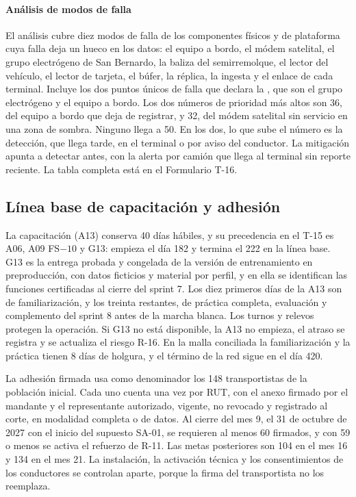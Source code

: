 \paragraph{Análisis de modos de falla}
El análisis cubre diez modos de falla de los componentes físicos y de plataforma cuya falla deja un hueco
en los datos: el equipo a bordo, el módem satelital, el grupo electrógeno de San Bernardo, la baliza del
semirremolque, el lector del vehículo, el lector de tarjeta, el búfer, la réplica, la ingesta y el enlace
de cada terminal. Incluye los dos puntos únicos de falla que declara la , que
son el grupo electrógeno y el equipo a bordo. Los dos números de prioridad más altos son 36, del equipo a
bordo que deja de registrar, y 32, del módem satelital sin servicio en una zona de sombra. Ninguno llega
a 50. En los dos, lo que sube el número es la detección, que llega tarde, en el terminal o por aviso del
conductor. La mitigación apunta a detectar antes, con la alerta por camión que llega
al terminal sin reporte reciente. La tabla completa está en el Formulario T-16.

\subsection{Línea base de capacitación y adhesión}\label{sec:8-acuerdo-capacitacion-adhesion}

La capacitación (A13) conserva 40 días hábiles, y su precedencia en el T-15 es A06, A09 FS$-10$ y G13:
empieza el día 182 y termina el 222 en la línea base. G13 es la entrega probada y congelada de la versión
de entrenamiento en preproducción, con datos ficticios y material por perfil, y en ella se identifican
las funciones certificadas al cierre del sprint 7. Los diez primeros días de la A13 son de
familiarización, y los treinta restantes, de práctica completa, evaluación y complemento del sprint 8
antes de la marcha blanca. Los turnos y relevos protegen la operación. Si G13 no está disponible, la A13
no empieza, el atraso se registra y se actualiza el riesgo R-16. En la malla conciliada la familiarización
y la práctica tienen 8 días de holgura, y el término de la red sigue en el día 420.

La adhesión firmada usa como denominador los 148 transportistas de la población inicial. Cada uno cuenta
una vez por RUT, con el anexo firmado por el mandante y el representante autorizado, vigente, no revocado
y registrado al corte, en modalidad completa o de datos. Al cierre del mes 9, el 31 de octubre de 2027
con el inicio del supuesto SA-01, se requieren al menos 60 firmados, y con 59 o menos se activa el
refuerzo de R-11. Las metas posteriores son 104 en el mes 16 y 134 en el mes 21. La instalación, la
activación técnica y los consentimientos de los conductores se controlan aparte, porque la firma del
transportista no los reemplaza.

